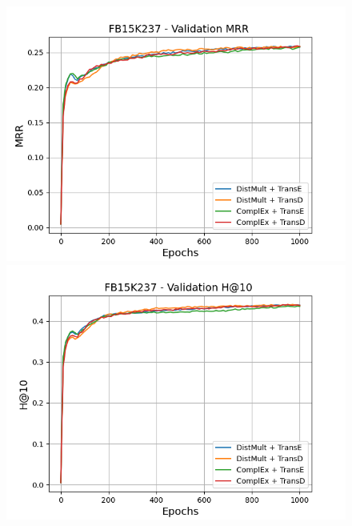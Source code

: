 \begin{figure}
    \centering
    \begin{minipage}{.5\textwidth}
      \centering
      \includegraphics[width=\linewidth]{figures/results/gan_train/not_pretrained/random/fb15k237/epochs1000/random_fb15k237_mrrs.png}
    \end{minipage}%
    \begin{minipage}{.5\textwidth}
      \centering
      \includegraphics[width=\linewidth]{figures/results/gan_train/not_pretrained/random/fb15k237/epochs1000/random_fb15k237_hit10.png}
    \end{minipage}
    

\end{figure}
